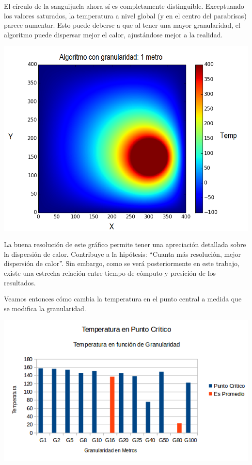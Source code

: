 	El círculo de la sanguijuela ahora sí es completamente distinguible. Exceptuando los valores saturados, la temperatura a nivel global (y en el centro del parabrisas) parece aumentar. Esto puede deberse a que al tener una mayor granularidad, el algoritmo puede dispersar mejor el calor, ajustándose mejor a la realidad.

	\begin{center}
		\includegraphics[scale=0.5]{./img/granularidad/g1_t400_sinkill.png}
	\end{center}

	La buena resolución de este gráfico permite tener una apreciación detallada sobre la dispersión de calor. Contribuye a la hipótesis: ``Cuanta más resolución, mejor dispersión de calor''. Sin embargo, como se verá posteriormente en este trabajo, existe una estrecha relación entre tiempo de cómputo y presición de los resultados. 
	
	Veamos entonces cómo cambia la temperatura en el punto central a medida que se modifica la granularidad.


	\begin{center}
		\includegraphics[scale=0.75]{./img/temp_punto_critico/temppuntocritico.png}
	\end{center}

